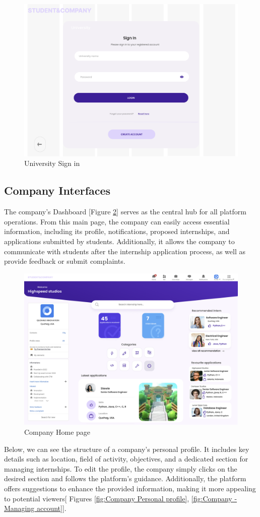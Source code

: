 \begin{figure} [H]
    \centering
    \includegraphics[width=0.5\linewidth]{Interface Images/log in sing up/Screenshot 2024-12-12 045139.png}
    \caption{University Sign in}
    \label{fig:University Sign in}
\end{figure}


\subsection{Company Interfaces}

The company's Dashboard [Figure \ref{fig:Company Home page}] serves as the central hub for all platform operations. From this main page, the company can easily access essential information, including its profile, notifications, proposed internships, and applications submitted by students. Additionally, it allows the company to communicate with students after the internship application process, as well as provide feedback or submit complaints.

\begin{figure} [H]
    \centering
    \includegraphics[width=0.5\linewidth]{Interface Images/company interface/Screenshot 2024-12-12 045319.png}
    \caption{Company Home page}
    \label{fig:Company Home page}
\end{figure}

Below, we can see the structure of a company's personal profile. It includes key details such as location, field of activity, objectives, and a dedicated section for managing internships. To edit the profile, the company simply clicks on the desired section and follows the platform's guidance. Additionally, the platform offers suggestions to enhance the provided information, making it more appealing to potential viewers[ Figures \ref{fig:Company Personal profile}, \ref{fig:Company - Managing account}].


